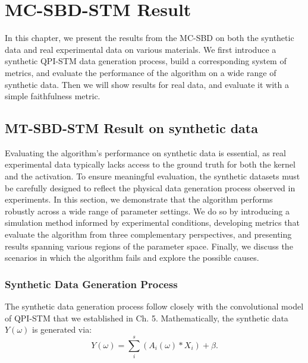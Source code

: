 \chapter{MC-SBD-STM Result}

In this chapter, we present the results from the \ac{MC-SBD} on both the synthetic data and real experimental data on various materials. We first introduce a synthetic QPI-STM data generation process, build a corresponding system of metrics, and evaluate the performance of the algorithm on a wide range of synthetic data. Then we will show results for real data, and evaluate it with a simple faithfulness metric. 

\section{MT-SBD-STM Result on synthetic data}
Evaluating the algorithm's performance on synthetic data is essential, as real experimental data typically lacks access to the ground truth for both the kernel and the activation. To ensure meaningful evaluation, the synthetic datasets must be carefully designed to reflect the physical data generation process observed in experiments. In this section, we demonstrate that the algorithm performs robustly across a wide range of parameter settings. We do so by introducing a simulation method informed by experimental conditions, developing metrics that evaluate the algorithm from three complementary perspectives, and presenting results spanning various regions of the parameter space. Finally, we discuss the scenarios in which the algorithm fails and explore the possible causes.

\subsection{Synthetic Data Generation Process}
The synthetic data generation process follow closely with the convolutional model of QPI-STM that we established in Ch. 5. Mathematically, the synthetic data $Y(\omega)$ is generated via:
\begin{equation}
	Y(\omega) = \sum_i^s ( A_i(\omega) * X_i) + \beta. 
\end{equation} 


